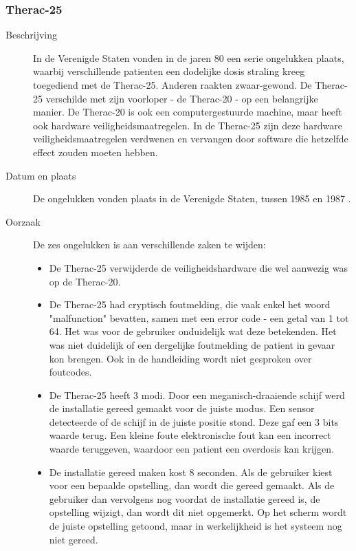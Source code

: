 \documentclass{article}
\begin{document}
			\subsubsection{Therac-25}
			\begin{description}
				\item[Beschrijving] 
				In de Verenigde Staten vonden in de jaren 80 een serie ongelukken plaats, waarbij verschillende patienten een dodelijke dosis straling kreeg toegediend met de Therac-25. Anderen raakten zwaar-gewond. \cite{274940}\relax De Therac-25 verschilde met zijn voorloper - de Therac-20 - op een belangrijke manier. De Therac-20 is ook een computergestuurde machine, maar heeft ook hardware veiligheidsmaatregelen. In de Therac-25 zijn deze hardware veiligheidsmaatregelen verdwenen en vervangen door software die hetzelfde effect zouden moeten hebben. \cite{thomas1994story}\relax
				\item[Datum en plaats] 
				De ongelukken vonden plaats in de Verenigde Staten, tussen 1985 en 1987 \cite{274940}\relax.
				\item[Oorzaak]
				De zes ongelukken is aan verschillende zaken te wijden:
				\begin{itemize}
					\item De Therac-25 verwijderde de veiligheidshardware die wel aanwezig was op de Therac-20.
					\item De Therac-25 had cryptisch foutmelding, die vaak enkel het woord "malfunction" bevatten, samen met een error code - een getal van 1 tot 64. Het was voor de gebruiker onduidelijk wat deze betekenden. Het was niet duidelijk of een dergelijke foutmelding de patient in gevaar kon brengen. Ook in de handleiding wordt niet gesproken over foutcodes.
					\item De Therac-25 heeft 3 modi. Door een meganisch-draaiende schijf werd de installatie gereed gemaakt voor de juiste modus. Een sensor detecteerde of de schijf in de juiste positie stond. Deze gaf een 3 bits waarde terug. Een kleine foute elektronische fout kan een incorrect waarde teruggeven, waardoor een patient een overdosis kan krijgen.
					\item De installatie gereed maken kost 8 seconden. Als de gebruiker kiest voor een bepaalde opstelling, dan wordt die gereed gemaakt. Als de gebruiker dan vervolgens nog voordat de installatie gereed is, de opstelling wijzigt, dan wordt dit niet opgemerkt. Op het scherm wordt de juiste opstelling getoond, maar in werkelijkheid is het systeem nog niet gereed.
				\end{itemize}
				
			\end{description}
			
\end{document}
